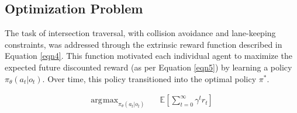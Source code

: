 \documentclass[letterpaper, 10 pt, conference]{ieeeconf}  %
\DeclareMathOperator*{\argmax}{\arg\!\max} %
\begin{document}
\subsection{Optimization Problem}
\label{Sub-Section: Optimization Problem I}

The task of intersection traversal, with collision avoidance and lane-keeping constraints, was addressed through the extrinsic reward function described in Equation \ref{eqn4}. This function motivated each individual agent to maximize the expected future discounted reward (as per Equation \ref{eqn5}) by learning a policy $\pi_\theta \left(a_t|o_t\right)$. Over time, this policy transitioned into the optimal policy $\pi^*$.

\begin{align}
\label{eqn5}
\argmax_{\pi_\theta \left(a_t|o_t\right)} \quad &\mathbb{E}\left [ \sum_{t=0}^{\infty} \gamma^t r_t \right ]
\end{align}
\end{document}
